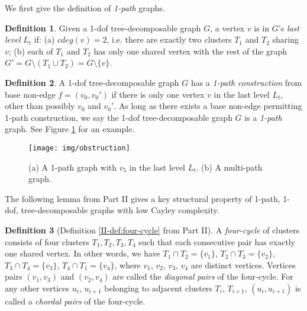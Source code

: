\documentclass[secthm,amsthm,english]{article}
\theoremstyle{definition}
\newtheorem{definition}{Definition}
\theoremstyle{remark}
\begin{document}
\noindent We first give the definition of \emph{1-path} graphs. 

\begin{definition} \label{def:last-level} 
Given a 1-dof tree-decomposable graph $G$, 
a vertex $v$ is in $G$'s {\emph{last level} $L_{t}$} if: 
(a) $cdeg(v)=2$, i.e. there are exactly two clusters $T_{1}$ and $T_{2}$ sharing $v$; 
(b) each of $T_{1}$ and $T_{2}$ has only one shared vertex with the rest of the graph 
$G'=G\setminus(T_{1}\cup T_{2}) = G\setminus\{v\}$. 
\end{definition}



\begin{definition}\label{def:1-path}
A 1-dof tree-decomposable graph $G$ has a {\emph{1-path construction}} from base non-edge $f=(v_{0},v_{0}')$ 
if there is only one vertex $v$ in the last level $L_{t}$, other than possibly $v_{0}$ and $v_{0}'$. 
As long as there exists a base non-edge permitting 1-path construction, we say the 1-dof tree-decomposable
graph $G$ is a {\emph{1-path}} graph. See Figure \ref{F:obstruction} for an example. 
\end{definition}

\begin{figure}[h]
	 
	  
	   
	  
	
	\begin{centering}
	\texttt{[image: img/obstruction]} 
	\par\end{centering}
	
	\caption{(a) A 1-path graph with $v_5$ in the last level $L_t$. (b) A multi-path graph.}
\label{F:obstruction} 
\end{figure}



The following lemma from Part II gives a key structural property of 1-path, 1-dof, tree-decomposable graphs with low Cayley complexity.


\begin{definition}[Definition \ref{II-def:four-cycle} from Part II]
A {\emph{four-cycle}} of clusters consists of four clusters $T_{1},T_{2},T_{3},T_{4}$ such that each consecutive pair has exactly one shared vertex. 
In other words, we have $T_{1}\cap T_{2}=\{v_{1}\}$, $T_{2}\cap T_{3}=\{v_{2}\}$, $T_{3}\cap T_{4}=\{v_{3}\}$, $T_{4}\cap T_{1}=\{v_{4}\}$, where $v_{1}$, $v_{2}$, $v_{3}$, $v_{4}$ are distinct vertices.
Vertices pairs $(v_1,v_3)$ and $(v_2,v_4)$ are called the \emph{diagonal pairs} of the four-cycle. 
For any other vertices $u_i$, $u_{i+1}$ belonging to adjacent clusters $T_i$, $T_{i+1}$, 
$(u_i, u_{i+1})$ is called a {\emph{chordal pairs}} of the four-cycle. 
\end{definition}
\end{document}
